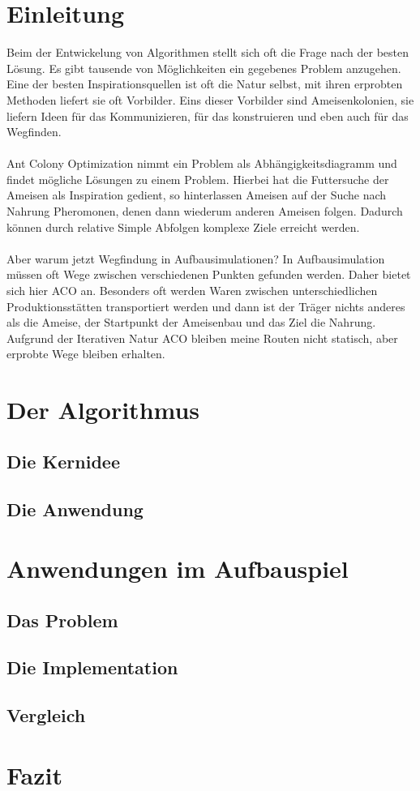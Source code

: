 \documentclass[12pt]{article}
\begin{document}
\tableofcontents
\pagebreak

\section{Einleitung}
Beim der Entwickelung von Algorithmen stellt sich oft die Frage nach der besten Lösung. Es gibt tausende von Möglichkeiten ein gegebenes Problem anzugehen. Eine der besten Inspirationsquellen ist oft die Natur selbst, mit ihren erprobten Methoden liefert sie oft Vorbilder. Eins dieser Vorbilder sind Ameisenkolonien, sie liefern Ideen für das Kommunizieren, für das konstruieren und eben auch für das Wegfinden.\\\\
Ant Colony Optimization nimmt ein Problem als Abhängigkeitsdiagramm und findet mögliche Lösungen zu einem Problem. Hierbei hat die Futtersuche der Ameisen als Inspiration gedient, so hinterlassen Ameisen auf der Suche nach Nahrung Pheromonen, denen dann wiederum anderen Ameisen folgen. Dadurch können durch relative Simple Abfolgen komplexe Ziele erreicht werden.\\\\
Aber warum jetzt Wegfindung in Aufbausimulationen? In Aufbausimulation müssen oft Wege zwischen verschiedenen Punkten gefunden werden. Daher bietet sich hier ACO an. Besonders oft werden Waren zwischen unterschiedlichen Produktionsstätten transportiert werden und dann ist der Träger nichts anderes als die Ameise, der Startpunkt der Ameisenbau und das Ziel die Nahrung. Aufgrund der Iterativen Natur ACO bleiben meine Routen nicht statisch, aber erprobte Wege bleiben erhalten.
\section{Der Algorithmus}

\subsection{Die Kernidee}

\subsection{Die Anwendung}

\section{Anwendungen im Aufbauspiel}

\subsection{Das Problem}

\subsection{Die Implementation}

\subsection{Vergleich}

\section{Fazit}


\nocite{*}
\printbibliography
\end{document}
